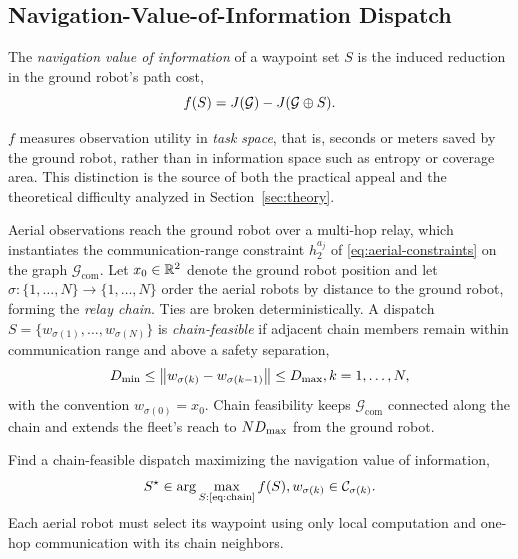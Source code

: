 \subsection{Navigation-Value-of-Information Dispatch}
\label{sec:nvoi-dispatch}

\begin{definition}
\label{def:nvoi}
The \emph{navigation value of information} of a waypoint set $S$ is the induced reduction in the ground robot's path cost,
\begin{equation} f(S) = J(\mathcal{G}) - J(\mathcal{G} \oplus S). \label{eq:nvoi} \end{equation}
\end{definition}

$f$ measures observation utility in \emph{task space}, that is, seconds or meters saved by the ground robot, rather than in information space such as entropy or coverage area. This distinction is the source of both the practical appeal and the theoretical difficulty analyzed in Section~\ref{sec:theory}.

Aerial observations reach the ground robot over a multi-hop relay, which instantiates the communication-range constraint $h_2^{a_j}$ of \eqref{eq:aerial-constraints} on the graph $\mathcal{G}_{\mathrm{com}}$. Let $x_0 \in \mathbb{R}^2$ denote the ground robot position and let $\sigma : \{1, \dots, N\} \to \{1, \dots, N\}$ order the aerial robots by distance to the ground robot, forming the \emph{relay chain}. Ties are broken deterministically. A dispatch $S = \{w_{\sigma(1)}, \dots, w_{\sigma(N)}\}$ is \emph{chain-feasible} if adjacent chain members remain within communication range and above a safety separation,
\begin{equation} D_{\min} \leq \bigl\| w_{\sigma(k)} - w_{\sigma(k-1)} \bigr\| \leq D_{\max}, k = 1, \dots, N, \label{eq:chain} \end{equation}
with the convention $w_{\sigma(0)} = x_0$. Chain feasibility keeps $\mathcal{G}_{\mathrm{com}}$ connected along the chain and extends the fleet's reach to $N D_{\max}$ from the ground robot.

\begin{problem}
\label{prob:dispatch}
Find a chain-feasible dispatch maximizing the navigation value of information,
\begin{equation} S^{\star} \in \arg\max_{S : \text{\eqref{eq:chain}}} f(S), w_{\sigma(k)} \in \mathcal{C}_{\sigma(k)}. \label{eq:problem} \end{equation}
Each aerial robot must select its waypoint using only local computation and one-hop communication with its chain neighbors.
\end{problem}

